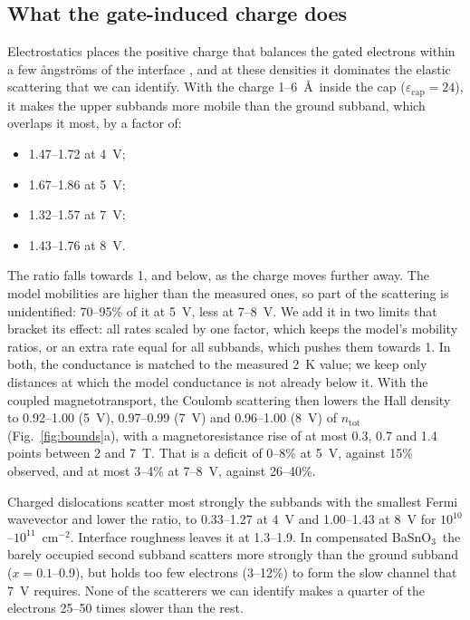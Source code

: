 \documentclass[11pt]{article}
\newcommand{\BSO}{\texorpdfstring{BaSnO$_3$}{BaSnO3}}
\newcommand{\ntot}{n_\mathrm{tot}}
\begin{document}
\subsection{What the gate-induced charge does}\label{sec:coulomb}
Electrostatics places the positive charge that balances the gated electrons within a few \aa ngstr\"oms of the interface \cite{OwnbyMAT02}, and at these densities it dominates the elastic scattering that we can identify. With the charge 1--6~\AA\ inside the cap ($\varepsilon_\mathrm{cap}=24$), it makes the upper subbands more mobile than the ground subband, which overlaps it most, by a factor of:
\begin{itemize}
\item 1.47--1.72 at 4~V;
\item 1.67--1.86 at 5~V;
\item 1.32--1.57 at 7~V;
\item 1.43--1.76 at 8~V.
\end{itemize}
The ratio falls towards 1, and below, as the charge moves further away. The model mobilities are higher than the measured ones, so part of the scattering is unidentified: 70--95\% of it at 5~V, less at 7--8~V. We add it in two limits that bracket its effect: all rates scaled by one factor, which keeps the model's mobility ratios, or an extra rate equal for all subbands, which pushes them towards 1. In both, the conductance is matched to the measured 2~K value; we keep only distances at which the model conductance is not already below it. With the coupled magnetotransport, the Coulomb scattering then lowers the Hall density to 0.92--1.00 (5~V), 0.97--0.99 (7~V) and 0.96--1.00 (8~V) of $\ntot$ (Fig.~\ref{fig:bounds}a), with a magnetoresistance rise of at most 0.3, 0.7 and 1.4 points between 2 and 7~T. That is a deficit of 0--8\% at 5~V, against 15\% observed, and at most 3--4\% at 7--8~V, against 26--40\%.

Charged dislocations scatter most strongly the subbands with the smallest Fermi wavevector and lower the ratio, to 0.33--1.27 at 4~V and 1.00--1.43 at 8~V for $10^{10}$--$10^{11}$~cm$^{-2}$. Interface roughness leaves it at 1.3--1.9. In compensated \BSO\ the barely occupied second subband scatters more strongly than the ground subband ($x=0.1$--0.9), but holds too few electrons (3--12\%) to form the slow channel that 7~V requires. None of the scatterers we can identify makes a quarter of the electrons 25--50 times slower than the rest.
\end{document}
